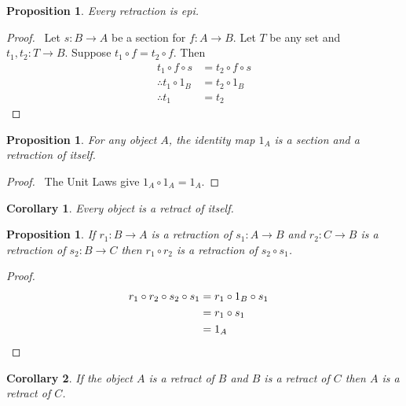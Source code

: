 \documentclass{article}
\let\qed\relax
\newtheorem{proposition}[axiom]{Proposition}
\newtheorem{cor}{Corollary}[axiom]
\theoremstyle{definition}
\begin{document}
\begin{proposition}
    Every retraction is epi.
\end{proposition}

\begin{proof}
    \pf\     Let $s : B \rightarrow A$ be a section for $f : A \rightarrow B$. Let $T$ be any set and $t_1, t_2 : T \rightarrow B$.
    Suppose $t_1 \circ f = t_2 \circ f$. Then
    \begin{align*}
        t_1 \circ f \circ s & = t_2 \circ f \circ s \\
        \therefore t_1 \circ 1_B & = t_2 \circ 1_B \\
        \therefore t_1 & = t_2
    \end{align*}
\end{proof}

\begin{proposition}
    For any object $A$, the identity map $1_A$ is a section and a retraction of itself.
\end{proposition}

\begin{proof}
    \pf\ The Unit Laws give $1_A \circ 1_A = 1_A$. \qed
\end{proof}

\begin{cor}
    Every object is a retract of itself.
\end{cor}

\begin{proposition}
    \label{proposition:retraction_comp}
    If $r_1 : B \rightarrow A$ is a retraction of $s_1 : A \rightarrow B$ and $r_2 : C \rightarrow B$
    is a retraction of $s_2 : B \rightarrow C$ then $r_1 \circ r_2$ is a retraction of $s_2 \circ s_1$.
\end{proposition}

\begin{proof}
    \pf
    \begin{align*}
        r_1 \circ r_2 \circ s_2 \circ s_1 & = r_1 \circ 1_B \circ s_1 \\
        & = r_1 \circ s_1 \\
        & = 1_A & \qed
    \end{align*}
\end{proof}

\begin{cor}
    If the object $A$ is a retract of $B$ and $B$ is a retract of $C$ then $A$ is a retract of $C$.
\end{cor}
\end{document}
